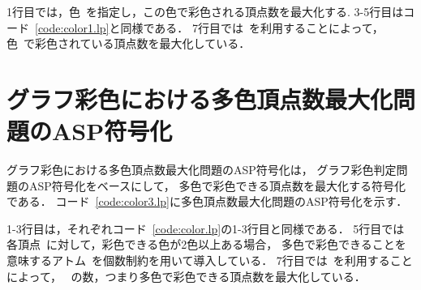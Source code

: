 1行目では，色~を指定し，この色で彩色される頂点数を最大化する.
3-5行目はコード~\ref{code:color1.lp}と同様である．
7行目では~を利用することによって，
色~で彩色されている頂点数を最大化している．


\section{グラフ彩色における多色頂点数最大化問題のASP符号化}



グラフ彩色における多色頂点数最大化問題のASP符号化は，
グラフ彩色判定問題のASP符号化をベースにして，
多色で彩色できる頂点数を最大化する符号化である．
コード~\ref{code:color3.lp}に多色頂点数最大化問題のASP符号化を示す．

1-3行目は，それぞれコード~\ref{code:color.lp}の1-3行目と同様である．
5行目では各頂点~に対して，彩色できる色が2色以上ある場合，
多色で彩色できることを意味するアトム~を個数制約を用いて導入している．
7行目では~を利用することによって，
~の数，つまり多色で彩色できる頂点数を最大化している．

